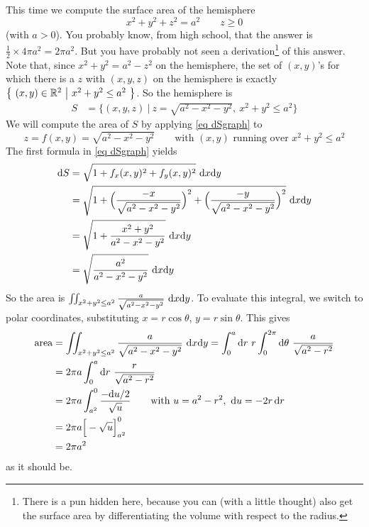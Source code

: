 \begin{eg}
       \label{eg area hemisphere}
This time we compute the surface area of the hemisphere
\begin{equation*}
x^2+y^2+z^2=a^2\qquad z\ge 0
\end{equation*}
(with $a>0$).
You probably know, from high school, that the answer is 
$\frac{1}{2}\times 4\pi a^2=2\pi a^2$. But you have probably 
not seen a derivation\footnote{There is a pun hidden here, because 
you can (with a little thought) also get the surface area by differentiating
the volume with respect to the radius.} of this answer.
Note that, since $x^2+y^2 = a^2-z^2$ on the hemisphere, the set
of $(x,y)$'s for which there is a $z$ with $(x,y,z)$ on the  hemisphere
is exactly $\big\{ \ (x,y)\in\mathbb{R}^2\ \big|\ x^2+y^2\le a^2\ \big\}$.
So the hemisphere is
\begin{align*}
S &= \Big\{(x,y,z)\ \Big|\ z=\sqrt{a^2-x^2-y^2},\ x^2+y^2\le a^2\Big\} 
\end{align*}
We will compute the area of $S$ by applying \eqref{eq dSgraph} to
\begin{equation*}
z=f(x,y) = \sqrt{a^2-x^2-y^2} 
\qquad\text{with $(x,y)$ running over $x^2+y^2\le a^2$}
\end{equation*}
The first formula in \eqref{eq dSgraph} yields
\begin{align*}
\mathrm{d}S&= \sqrt{1 + f_x(x,y)^2 + f_y(x,y)^2}\  \mathrm{d}x\mathrm{d}y \\
   &=\sqrt{1+\Big(\frac{-x}{\sqrt{a^2-x^2-y^2}}\Big)^2
            +\Big(\frac{-y}{\sqrt{a^2-x^2-y^2}}\Big)^2} \ \mathrm{d}x\mathrm{d}y \\
   &=\sqrt{1+\frac{x^2+y^2}{a^2-x^2-y^2}} \ \mathrm{d}x\mathrm{d}y \\
   &=\sqrt{\frac{a^2}{a^2-x^2-y^2}} \ \mathrm{d}x\mathrm{d}y 
\end{align*}
So the area is
$
\iint_{x^2+y^2\le a^2}\frac{a}{\sqrt{a^2-x^2-y^2}}
            \ \mathrm{d}x\mathrm{d}y 
$. 
To evaluate this integral, we switch to polar coordinates, substituting
$x=r\cos\theta$, $y=r\sin\theta$. This gives
\begin{align*}
\text{area}
&=\iint_{x^2+y^2\le a^2}\frac{a}{\sqrt{a^2-x^2-y^2}}
            \ \mathrm{d}x\mathrm{d}y 
=\int_0^a\mathrm{d}r\ r\int_0^{2\pi}\mathrm{d}\theta\  \frac{a}{\sqrt{a^2-r^2}} \\
&=2\pi a \int_0^a\mathrm{d}r\ \frac{r}{\sqrt{a^2-r^2}}
\\
&=2\pi a\int_{a^2}^0 \frac{-\mathrm{d}u/2}{\sqrt{u}}
\qquad\text{with $u=a^2-r^2,\ \mathrm{d}u = -2r\,\mathrm{d}r$} \\
&=2\pi a\Big[-\sqrt{u}\Big]_{a^2}^0 \\
&=2\pi a^2
\end{align*}
as it should be.

\end{eg}

